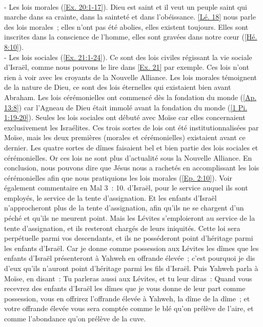 \begin{multicols}{2}
{\\- Les lois morales (\vref{Ex. 20:1-17}). Dieu est saint et il veut un peuple saint qui marche dans sa crainte, dans la sainteté et dans l'obéissance. \vref{Lé. 18} nous parle des lois morales~; elles n'ont pas été abolies, elles existent toujours. Elles sont inscrites dans la conscience de l'homme, elles sont gravées dans notre cœur (\vref{Hé. 8:10}).
\\- Les lois sociales (\vref{Ex. 21:1-24}). Ce sont des lois civiles régissant la vie sociale d'Israël, comme nous pouvons le lire dans \vref{Ex. 21} par exemple. Ces lois n'ont rien à voir avec les croyants de la Nouvelle Alliance. Les lois morales témoignent de la nature de Dieu, ce sont des lois éternelles qui existaient bien avant Abraham. Les lois cérémonielles ont commencé dès la fondation du monde (\vref{Ap. 13:8}) car l'Agneau de Dieu était immolé avant la fondation du monde (\vref{1 Pi. 1:19-20}). Seules les lois sociales ont débuté avec Moïse car elles concernaient exclusivement les Israélites. Ces trois sortes de lois ont été institutionnalisées par Moïse, mais les deux premières (morales et cérémonielles) existaient avant ce dernier. Les quatre sortes de dîmes faisaient bel et bien partie des lois sociales et cérémonielles. Or ces lois ne sont plus d'actualité sous la Nouvelle Alliance. En conclusion, nous pouvons dire que Jésus nous a rachetés en accomplissant les lois cérémonielles afin que nous pratiquions les lois morales (\vref{Ep. 2:10}). Voir également commentaire en Mal 3~: 10.} d'Israël, pour le service auquel ils sont employés, le service de la tente d'assignation.
Et les enfants d'Israël n'approcheront plus de la tente d'assignation, afin qu'ils ne se chargent d'un péché et qu'ils ne meurent point.
Mais les Lévites s'emploieront au service de la tente d'assignation, et ils resteront chargés de leurs iniquités. Cette loi sera perpétuelle parmi vos descendants, et ils ne posséderont point d'héritage parmi les enfants d'Israël.
Car je donne comme possession aux Lévites les dîmes que les enfants d'Israël présenteront à Yahweh en offrande élevée~; c'est pourquoi je dis d'eux qu'ils n'auront point d'héritage parmi les fils d'Israël.
Puis Yahweh parla à Moïse, en disant~:
Tu parleras aussi aux Lévites, et tu leur diras~: Quand vous recevrez des enfants d'Israël les dîmes que je vous donne de leur part comme possession, vous en offrirez l'offrande élevée à Yahweh, la dîme de la dîme~;
et votre offrande élevée vous sera comptée comme le blé qu'on prélève de l'aire, et comme l'abondance qu'on prélève de la cuve.

\end{multicols}
